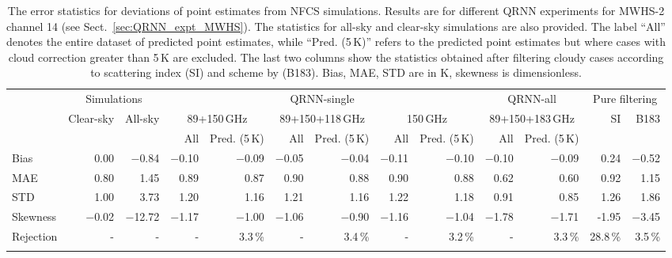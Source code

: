 \documentclass[amt, manuscript]{copernicus}
\begin{document}
\begin{table}[t]
	\caption{The error statistics for deviations of point estimates from NFCS simulations. Results are for different QRNN experiments for MWHS-2 channel 14 (see Sect.~\ref{sec:QRNN_expt_MWHS}). The statistics for all-sky and clear-sky simulations are also provided. The label ``All'' denotes the entire dataset of predicted point estimates, while ``Pred. (5\,K)'' refers to the predicted point estimates but where cases with cloud correction greater than 5\,K are excluded. The last two columns show the statistics obtained after filtering cloudy cases according to scattering index (SI) and scheme by \citet{buehler:aclou:07} (B183). Bias, MAE, STD are in K, skewness is dimensionless.}
	\label{tab:error_statistics_mwhs_14}
	\setlength{\tabcolsep}{4pt}
	\begin{tabular}{lrr|rr|rr|rr|rr|rr}
		\tophline
		&\multicolumn{2}{c|}{Simulations}& \multicolumn{6}{c|}{QRNN-single} & \multicolumn{2}{c|}{QRNN-all} & \multicolumn{2}{c}{Pure filtering}\\
		\cline{2-13}
		&   Clear-sky &   All-sky &  \multicolumn{2}{c|}{89+150\,GHz} & \multicolumn{2}{c|}{89+150+118\,GHz} & \multicolumn{2}{c|}{150\,GHz} & \multicolumn{2}{c|}{89+150+183\,GHz}& SI & B183\\		
		&			   &			& All & Pred. (5\,K) & All & Pred. (5\,K) & All & Pred. (5\,K)  & All & Pred. (5\,K)&&\\
		\middlehline
Bias     &  0.00 & $-$0.84 &$-$0.10 &$-$0.09 &$-$0.05 &$-$0.04 &$-$0.11 &$-$0.10 &$-$0.10 &$-$0.09 & 0.24  &$-$0.52\\
MAE      &  0.80 &   1.45 &  0.89 &  0.87 &  0.90 &  0.88 &  0.90 &  0.88 &  0.62 &  0.60 & 0.92  & 1.15\\
STD      &  1.00 &   3.73 &  1.20 &  1.16 &  1.21 &  1.16 &  1.22 &  1.18 &  0.91 &  0.85 & 1.26  & 1.86\\
Skewness &$-$0.02 &$-$12.72 &$-$1.17 &$-$1.00 &$-$1.06 &$-$0.90 &$-$1.16 &$-$1.04 &$-$1.78 &$-$1.71 &-1.95  &$-$3.45\\
Rejection& -	 &- 	  &-	  & 3.3\,\% &- 	  & 3.4\,\% &-     & 3.2\,\% &-     & 3.3\,\% & 28.8\,\%& 3.5\,\%\\
\bottomhline
	\end{tabular}
\end{table}
\end{document}
